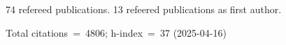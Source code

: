 74 refereed publications. 13 refeered publications as first author.

Total citations~=~4806; h-index~=~37 (2025-04-16)